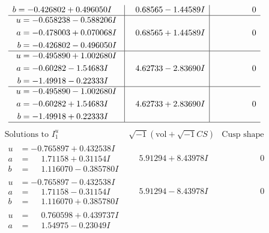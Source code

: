 \documentclass[1p]{elsarticle_modified}
\theoremstyle{definition}
\newcommand{\I}{\sqrt{-1}}
\begin{document}
$$\begin{array}{c|c|c}
\begin{aligned}
b &= -0.426802 + 0.496050 I\end{aligned}
 & \phantom{-}0.68565 - 1.44589 I & \phantom{-0.000000 } 0 \\ \hline\begin{aligned}
u &= -0.658238 - 0.588206 I \\
a &= -0.478003 + 0.070068 I \\
b &= -0.426802 - 0.496050 I\end{aligned}
 & \phantom{-}0.68565 + 1.44589 I & \phantom{-0.000000 } 0 \\ \hline\begin{aligned}
u &= -0.495890 + 1.002680 I \\
a &= -0.60282 - 1.54683 I \\
b &= -1.49918 - 0.22333 I\end{aligned}
 & \phantom{-}4.62733 - 2.83690 I & \phantom{-0.000000 } 0 \\ \hline\begin{aligned}
u &= -0.495890 - 1.002680 I \\
a &= -0.60282 + 1.54683 I \\
b &= -1.49918 + 0.22333 I\end{aligned}
 & \phantom{-}4.62733 + 2.83690 I & \phantom{-0.000000 } 0\\
 \hline 
 \end{array}$$\newpage$$\begin{array}{c|c|c}  
\text{Solutions to }I^u_{1}& \I (\text{vol} + \sqrt{-1}CS) & \text{Cusp shape}\\
 \hline 
\begin{aligned}
u &= -0.765897 + 0.432538 I \\
a &= \phantom{-}1.71158 + 0.31154 I \\
b &= \phantom{-}1.116070 - 0.385780 I\end{aligned}
 & \phantom{-}5.91294 + 8.43978 I & \phantom{-0.000000 } 0 \\ \hline\begin{aligned}
u &= -0.765897 - 0.432538 I \\
a &= \phantom{-}1.71158 - 0.31154 I \\
b &= \phantom{-}1.116070 + 0.385780 I\end{aligned}
 & \phantom{-}5.91294 - 8.43978 I & \phantom{-0.000000 } 0 \\ \hline\begin{aligned}
u &= \phantom{-}0.760598 + 0.439737 I \\
a &= \phantom{-}1.54975 - 0.23049 I \\

\end{aligned}
\end{array}$$
\end{document}
